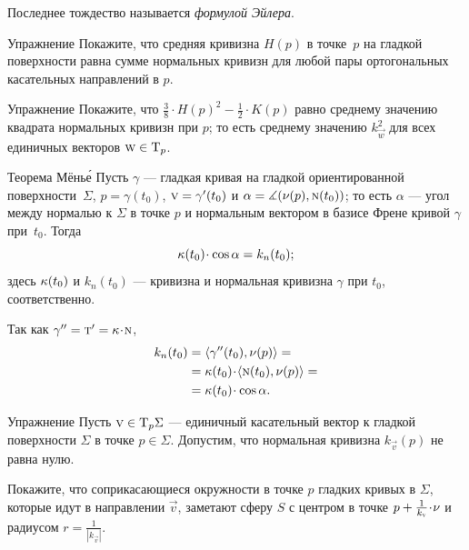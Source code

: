 Последнее тождество называется \emph{формулой Эйлера}.

\begin{thm}{Упражнение}\label{ex:mean-curvature}
Покажите, что средняя кривизна $H(p)$ в точке~$p$ на гладкой поверхности равна сумме нормальных кривизн для любой пары ортогональных касательных направлений в $p$. 
\end{thm}

\begin{thm}{Упражнение}\label{ex:average}
Покажите, что $\tfrac38\cdot H(p)^2-\tfrac12\cdot K(p)$ равно среднему значению квадрата нормальных кривизн при $p$;
то есть среднему значению $k_{\vec w}^2$ для всех единичных векторов ${\text{\sc{w}}}\in\mathrm{T}_p$.
\end{thm}

{\sloppy

\begin{thm}{Теорема Мёнь\'{е}}
\label{thm:meusnier}
Пусть $\gamma$ --- гладкая кривая на гладкой ориентированной поверхности~$\Sigma$, $p=\gamma(t_0)$, ${\vec v}\z=\gamma'(t_0)$ и $\alpha\z=\measuredangle(\Norm(p),\norm(t_0))$;
то есть $\alpha$ --- угол между нормалью к $\Sigma$ в точке $p$ и нормальным вектором в базисе Френе кривой $\gamma$ при~$t_0$.
Тогда 
\[\kur(t_0)\cdot\cos\alpha=k_{n}(t_0);\]
здесь $\kappa(t_0)$ и $k_n(t_0)$ --- кривизна и нормальная кривизна $\gamma$ при $t_0$, соответственно. 
\end{thm}

}

 Так как $\gamma''=\tan'=\kur\cdot \norm$, 
\begin{align*}
k_{n}(t_0)&=\langle\gamma''(t_0),\Norm(p)\rangle=
\\
&=\kur(t_0)\cdot\langle\norm(t_0),\Norm(p)\rangle=
\\
&=\kur(t_0)\cdot\cos\alpha.
\end{align*}
\qedsf

\begin{thm}{Упражнение}\label{ex:meusnier}
Пусть ${\vec v}\z\in \T_p\Sigma$ --- единичный касательный вектор к гладкой поверхности $\Sigma$ в точке $p\in\Sigma$.
Допустим, что нормальная кривизна $k_{\vec v}(p)$ не равна нулю.

Покажите, что соприкасающиеся окружности в точке $p$ гладких кривых в $\Sigma$, которые идут в направлении ${\vec v}$, заметают сферу $S$ с центром в точке $p+\tfrac1{k_{\vec v}}\cdot\Norm$ и радиусом $r=\tfrac1{|k_{\vec v}|}$.
\end{thm}





